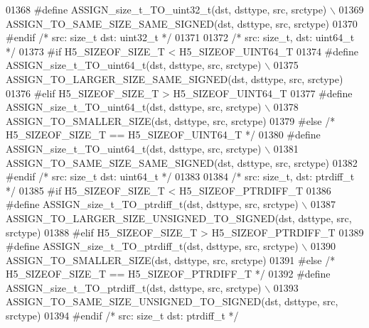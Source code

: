 \begin{DoxyCode}
01368 \textcolor{preprocessor}{    #define ASSIGN\_size\_t\_TO\_uint32\_t(dst, dsttype, src, srctype) \(\backslash\)}
01369 \textcolor{preprocessor}{        ASSIGN\_TO\_SAME\_SIZE\_SAME\_SIGNED(dst, dsttype, src, srctype)}
01370 \textcolor{preprocessor}{#endif }\textcolor{comment}{/* src: size\_t dst: uint32\_t */}\textcolor{preprocessor}{}
01371 
01372 \textcolor{comment}{/* src: size\_t, dst: uint64\_t */}
01373 \textcolor{preprocessor}{#if H5\_SIZEOF\_SIZE\_T < H5\_SIZEOF\_UINT64\_T}
01374 \textcolor{preprocessor}{    #define ASSIGN\_size\_t\_TO\_uint64\_t(dst, dsttype, src, srctype) \(\backslash\)}
01375 \textcolor{preprocessor}{        ASSIGN\_TO\_LARGER\_SIZE\_SAME\_SIGNED(dst, dsttype, src, srctype)}
01376 \textcolor{preprocessor}{#elif H5\_SIZEOF\_SIZE\_T > H5\_SIZEOF\_UINT64\_T}
01377 \textcolor{preprocessor}{    #define ASSIGN\_size\_t\_TO\_uint64\_t(dst, dsttype, src, srctype) \(\backslash\)}
01378 \textcolor{preprocessor}{        ASSIGN\_TO\_SMALLER\_SIZE(dst, dsttype, src, srctype)}
01379 \textcolor{preprocessor}{#else }\textcolor{comment}{/* H5\_SIZEOF\_SIZE\_T == H5\_SIZEOF\_UINT64\_T */}\textcolor{preprocessor}{}
01380 \textcolor{preprocessor}{    #define ASSIGN\_size\_t\_TO\_uint64\_t(dst, dsttype, src, srctype) \(\backslash\)}
01381 \textcolor{preprocessor}{        ASSIGN\_TO\_SAME\_SIZE\_SAME\_SIGNED(dst, dsttype, src, srctype)}
01382 \textcolor{preprocessor}{#endif }\textcolor{comment}{/* src: size\_t dst: uint64\_t */}\textcolor{preprocessor}{}
01383 
01384 \textcolor{comment}{/* src: size\_t, dst: ptrdiff\_t */}
01385 \textcolor{preprocessor}{#if H5\_SIZEOF\_SIZE\_T < H5\_SIZEOF\_PTRDIFF\_T}
01386 \textcolor{preprocessor}{    #define ASSIGN\_size\_t\_TO\_ptrdiff\_t(dst, dsttype, src, srctype) \(\backslash\)}
01387 \textcolor{preprocessor}{        ASSIGN\_TO\_LARGER\_SIZE\_UNSIGNED\_TO\_SIGNED(dst, dsttype, src, srctype)}
01388 \textcolor{preprocessor}{#elif H5\_SIZEOF\_SIZE\_T > H5\_SIZEOF\_PTRDIFF\_T}
01389 \textcolor{preprocessor}{    #define ASSIGN\_size\_t\_TO\_ptrdiff\_t(dst, dsttype, src, srctype) \(\backslash\)}
01390 \textcolor{preprocessor}{        ASSIGN\_TO\_SMALLER\_SIZE(dst, dsttype, src, srctype)}
01391 \textcolor{preprocessor}{#else }\textcolor{comment}{/* H5\_SIZEOF\_SIZE\_T == H5\_SIZEOF\_PTRDIFF\_T */}\textcolor{preprocessor}{}
01392 \textcolor{preprocessor}{    #define ASSIGN\_size\_t\_TO\_ptrdiff\_t(dst, dsttype, src, srctype) \(\backslash\)}
01393 \textcolor{preprocessor}{        ASSIGN\_TO\_SAME\_SIZE\_UNSIGNED\_TO\_SIGNED(dst, dsttype, src, srctype)}
01394 \textcolor{preprocessor}{#endif }\textcolor{comment}{/* src: size\_t dst: ptrdiff\_t */}\textcolor{preprocessor}{}

\end{DoxyCode}
